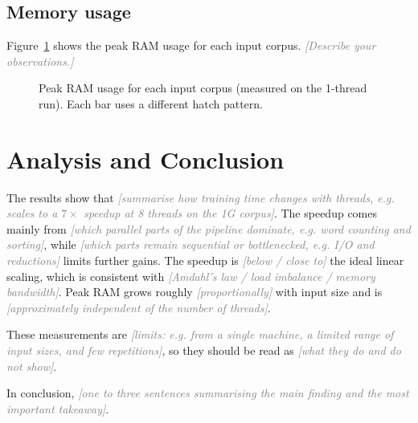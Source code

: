 \documentclass[manuscript,screen,nonacm]{acmart}
\newcommand{\fillin}[1]{\textcolor{gray}{\textit{[#1]}}}
\begin{document}
\subsection{Memory usage}
Figure~\ref{fig:ram} shows the peak RAM usage for each input corpus. \fillin{Describe your observations.}
\begin{figure}[h]
  \centering
  \caption{Peak RAM usage for each input corpus (measured on the 1-thread
  run). Each bar uses a different hatch pattern.}
  \label{fig:ram}
\end{figure}

\section{Analysis and Conclusion}


The results show that \fillin{summarise how training time changes with
threads, e.g. scales to a $7\times$ speedup at 8 threads on the 1G corpus}.
The speedup comes mainly from \fillin{which parallel parts of the pipeline
dominate, e.g. word counting and sorting}, while \fillin{which parts remain
sequential or bottlenecked, e.g. I/O and reductions} limits further gains.
The speedup is \fillin{below / close to} the ideal linear scaling, which is
consistent with \fillin{Amdahl's law / load imbalance / memory bandwidth}.
Peak RAM grows roughly \fillin{proportionally} with input size and is
\fillin{approximately independent of the number of threads}.

These measurements are \fillin{limits: e.g. from a single machine, a limited
range of input sizes, and few repetitions}, so they should be read as
\fillin{what they do and do not show}.

In conclusion, \fillin{one to three sentences summarising the main finding
and the most important takeaway}.
\end{document}
